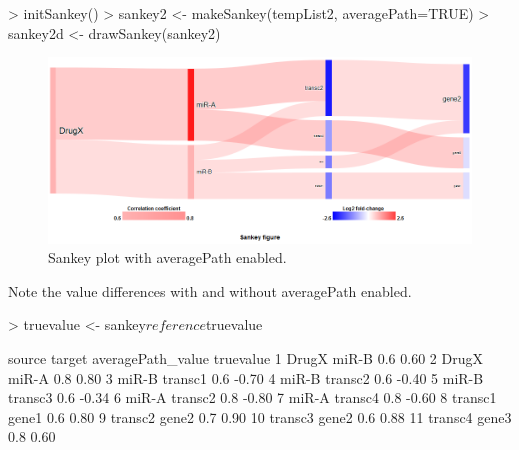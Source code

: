 \documentclass[a4paper]{article}
\begin{document}
\begin{Schunk}
\begin{Sinput}
> initSankey()
> sankey2 <- makeSankey(tempList2, averagePath=TRUE)
> sankey2d <- drawSankey(sankey2)
\end{Sinput}
\end{Schunk}


\begin{figure}[htbp]
    \begin{center}
    \includegraphics[width=\textwidth]{figure2.png}
    \caption{Sankey plot with averagePath enabled.}
    \end{center}
\end{figure}

Note the value differences with and without averagePath enabled.

\begin{Schunk}
\begin{Sinput}
> truevalue <-  sankey$reference$truevalue
\end{Sinput}
\end{Schunk}
\begin{Schunk}
\begin{Soutput}
    source  target averagePath_value truevalue
1    DrugX   miR-B               0.6      0.60
2    DrugX   miR-A               0.8      0.80
3    miR-B transc1               0.6     -0.70
4    miR-B transc2               0.6     -0.40
5    miR-B transc3               0.6     -0.34
6    miR-A transc2               0.8     -0.80
7    miR-A transc4               0.8     -0.60
8  transc1   gene1               0.6      0.80
9  transc2   gene2               0.7      0.90
10 transc3   gene2               0.6      0.88
11 transc4   gene3               0.8      0.60
\end{Soutput}
\end{Schunk}
\end{document}
